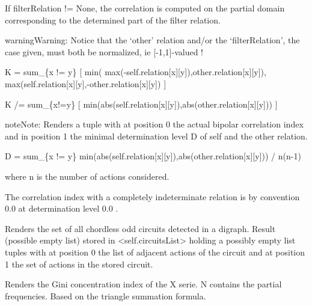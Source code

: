 \documentclass[letterpaper,10pt,english]{sphinxmanual}
\begin{document}
\begin{fulllineitems}
\begin{fulllineitems}
If filterRelation != None, the correlation is computed on the partial domain corresponding to the determined part of the filter relation.

\begin{notice}{warning}{Warning:}
Notice that the `other' relation and/or the `filterRelation',
the case given, must both be normalized, ie {[}-1,1{]}-valued !
\end{notice}

K = sum\_\{x != y\} {[} min( max(-self.relation{[}x{]}{[}y{]}),other.relation{[}x{]}{[}y{]}), max(self.relation{[}x{]}{[}y{]},-other.relation{[}x{]}{[}y{]}) {]}

K /= sum\_\{x!=y\} {[} min(abs(self.relation{[}x{]}{[}y{]}),abs(other.relation{[}x{]}{[}y{]})) {]}

\begin{notice}{note}{Note:}
Renders a tuple with at position 0 the actual bipolar correlation index
and in position 1 the minimal determination level D of self and
the other relation.

D = sum\_\{x != y\} min(abs(self.relation{[}x{]}{[}y{]}),abs(other.relation{[}x{]}{[}y{]})) / n(n-1)

where n is the number of actions considered.

The correlation index with a completely indeterminate relation
is by convention 0.0 at determination level 0.0 .
\end{notice}

\end{fulllineitems}


\begin{fulllineitems}
\label{techDoc:digraphs.Digraph.computeChordlessCircuits}
Renders the set of all chordless odd circuits detected in a digraph.
Result (possible empty list) stored in \textless{}self.circuitsList\textgreater{}
holding a possibly empty list tuples with at position 0 the
list of adjacent actions of the circuit and at position 1
the set of actions in the stored circuit.

\end{fulllineitems}


\begin{fulllineitems}
\label{techDoc:digraphs.Digraph.computeConcentrationIndex}
Renders the Gini concentration index of the X serie.
N contains the partial frequencies.
Based on the triangle summation formula.


\end{fulllineitems}
\end{fulllineitems}
\end{document}
